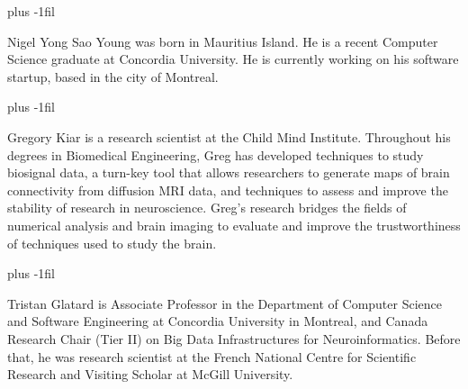 \documentclass[10pt,journal,compsoc]{IEEEtran}
\begin{document}
\baselineskip plus -1fil
\begin{IEEEbiography}{Nigel
        Yong Sao Young} was born in Mauritius Island. He is a recent Computer
    Science graduate at Concordia University. He is currently working on his
    software startup, based in the city of Montreal.
\end{IEEEbiography}

\baselineskip plus -1fil
\begin{IEEEbiography}{Gregory
        Kiar} is a research scientist at the Child Mind Institute. Throughout
    his degrees in Biomedical Engineering, Greg has developed techniques to
    study biosignal data, a turn-key tool that allows researchers to
    generate maps of brain connectivity from diffusion MRI data, and
    techniques to assess and improve the stability of research in
    neuroscience. Greg’s research bridges the fields of numerical analysis
    and brain imaging to evaluate and improve the trustworthiness of
    techniques used to study the brain.
\end{IEEEbiography}

\baselineskip plus -1fil
\begin{IEEEbiography}{Tristan
        Glatard} is Associate Professor in the Department of Computer Science
    and Software Engineering at Concordia University in Montreal, and Canada
    Research Chair (Tier II) on Big Data Infrastructures for
    Neuroinformatics. Before that, he was research scientist at the French
    National Centre for Scientific Research and Visiting Scholar at McGill
    University.
\end{IEEEbiography}
\end{document}
